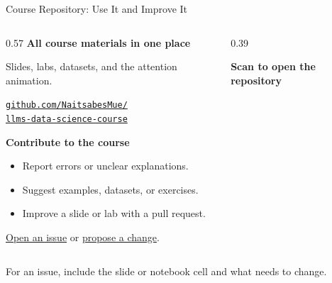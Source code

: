 \documentclass[aspectratio=169]{beamer}
\begin{document}
\begin{frame}{Course Repository: Use It and Improve It}
  \begin{columns}[c,onlytextwidth]
    \begin{column}{0.57\textwidth}
      \textbf{All course materials in one place}
      \par\vspace{0.3em}
      \small Slides, labs, datasets, and the attention animation.
      \par\vspace{0.5em}
      \href{https://github.com/NaitsabesMue/llms-data-science-course}{\texttt{github.com/NaitsabesMue/}}\\
      \href{https://github.com/NaitsabesMue/llms-data-science-course}{\texttt{llms-data-science-course}}
      \par\vspace{1em}
      \textbf{Contribute to the course}
      \begin{itemize}
        \item Report errors or unclear explanations.
        \item Suggest examples, datasets, or exercises.
        \item Improve a slide or lab with a pull request.
      \end{itemize}
      \href{https://github.com/NaitsabesMue/llms-data-science-course/issues}{Open an issue}
      or \href{https://github.com/NaitsabesMue/llms-data-science-course/pulls}{propose a change}.
    \end{column}
    \begin{column}{0.39\textwidth}
      \centering
      {\color{black}}
      \par\vspace{0.4em}
      \small \textbf{Scan to open the repository}
    \end{column}
  \end{columns}
  \vspace{0.8em}
  \footnotesize For an issue, include the slide or notebook cell and what needs to change.
\end{frame}
\end{document}

